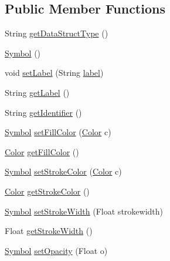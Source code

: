 \subsection*{Public Member Functions}
\begin{DoxyCompactItemize}
\item 
String \hyperlink{classbridges_1_1base_1_1_symbol_abd8f06c176f61273acd56e91b150c11b}{get\+Data\+Struct\+Type} ()
\item 
\hyperlink{classbridges_1_1base_1_1_symbol_a5449cffb7ffdbab093a110957158acc6}{Symbol} ()
\item 
void \hyperlink{classbridges_1_1base_1_1_symbol_af6b944374cbd34334caac28d948a3f21}{set\+Label} (String \hyperlink{classbridges_1_1base_1_1_symbol_ad2adcc82e6a96c2f3c465702502655e9}{label})
\item 
String \hyperlink{classbridges_1_1base_1_1_symbol_a7616c25b288a6e464f4f0b5fe4bd2826}{get\+Label} ()
\item 
String \hyperlink{classbridges_1_1base_1_1_symbol_a53cea862b06ffc230ca68d4d34c8820d}{get\+Identifier} ()
\item 
\hyperlink{classbridges_1_1base_1_1_symbol}{Symbol} \hyperlink{classbridges_1_1base_1_1_symbol_ab9fa8c9df32ee0ded33146ef344943d7}{set\+Fill\+Color} (\hyperlink{classbridges_1_1base_1_1_color}{Color} c)
\item 
\hyperlink{classbridges_1_1base_1_1_color}{Color} \hyperlink{classbridges_1_1base_1_1_symbol_aed2e531266c8a3bc563709c6486380cc}{get\+Fill\+Color} ()
\item 
\hyperlink{classbridges_1_1base_1_1_symbol}{Symbol} \hyperlink{classbridges_1_1base_1_1_symbol_a10abfbf4651ffdc630121da84e23b116}{set\+Stroke\+Color} (\hyperlink{classbridges_1_1base_1_1_color}{Color} c)
\item 
\hyperlink{classbridges_1_1base_1_1_color}{Color} \hyperlink{classbridges_1_1base_1_1_symbol_abd38aaea2fc344adcc8096ed6eb8681c}{get\+Stroke\+Color} ()
\item 
\hyperlink{classbridges_1_1base_1_1_symbol}{Symbol} \hyperlink{classbridges_1_1base_1_1_symbol_a0d432410bcbee83060f064d69365bbea}{set\+Stroke\+Width} (Float strokewidth)
\item 
Float \hyperlink{classbridges_1_1base_1_1_symbol_aa9f4b8ed61cfd3a30dc979d53526ab4e}{get\+Stroke\+Width} ()
\item 
\hyperlink{classbridges_1_1base_1_1_symbol}{Symbol} \hyperlink{classbridges_1_1base_1_1_symbol_a1a0bf2838187440b3cf4b2a656eb3620}{set\+Opacity} (Float o)
\item 

\end{DoxyCompactItemize}
